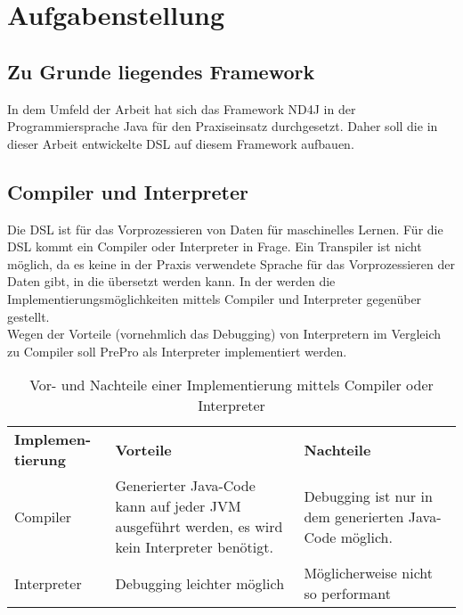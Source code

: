 \chapter{Aufgabenstellung}
\section{Zu Grunde liegendes Framework}
In dem Umfeld der Arbeit hat sich das Framework ND4J in der Programmiersprache Java für den Praxiseinsatz durchgesetzt.
Daher soll die in dieser Arbeit entwickelte \ac{DSL} auf diesem Framework aufbauen.

\section{Compiler und Interpreter}
Die \ac{DSL} ist für das Vorprozessieren von Daten für maschinelles Lernen.
Für die \ac{DSL} kommt ein Compiler oder Interpreter in Frage.
Ein Transpiler ist nicht möglich, da es keine in der Praxis verwendete Sprache für das Vorprozessieren der Daten gibt, in die übersetzt werden kann.
In der  werden die Implementierungsmöglichkeiten mittels Compiler und Interpreter gegenüber gestellt.\\
Wegen der Vorteile (vornehmlich das Debugging) von Interpretern im Vergleich zu Compiler soll PrePro als Interpreter implementiert werden.

\begin{table}[H]
	\centering
	\begin{tabular}{ | p{3cm} | p{6cm} | p{6cm} | }
		\hline \rowcolor{gray!15}
		\textbf{Implemen-tierung} & \textbf{Vorteile} & \textbf{Nachteile} \\ \hhline{|=|=|=|}
		Compiler & Generierter Java-Code kann auf jeder \ac{JVM} ausgeführt werden, es wird kein Interpreter benötigt. & Debugging ist nur in dem generierten Java-Code möglich. \\ \hline
		Interpreter & Debugging leichter möglich & Möglicherweise nicht so performant \\ \hline
	\end{tabular}
	\caption{Vor- und Nachteile einer Implementierung mittels Compiler oder Interpreter}
	\label{tab:Vorteile_Compiler_Interpreter}
\end{table}

\label{sec:usedTechnologies}
